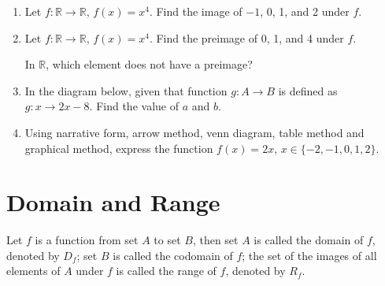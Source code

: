\documentclass{report}
\begin{document}
\begin{multicols}{2}
\begin{enumerate}
    \item Let $f: \mathbb{R} \to \mathbb{R}$, $f(x) = x^4$. Find the image of $-1$, 0, 1,
          and 2 under $f$.

    \item Let $f: \mathbb{R} \to \mathbb{R}$, $f(x) = x^4$. Find the preimage of 0, 1,
          and 4 under $f$.

          In $\mathbb{R}$, which element does not have a preimage?

    \item In the diagram below, given that function $g: A \to B$ is defined as $g: x \to
            2x - 8$. Find the value of $a$ and $b$.
          \begin{center}
          \end{center}

    \item Using narrative form, arrow method, venn diagram, table method and graphical
          method, express the function $f(x) = 2x$, $x \in \{-2, -1, 0, 1, 2\}$.
  \end{enumerate}

  \section{Domain and Range}

  \begin{mdframed}[style=MyFrame]
    Let $f$ is a function from set $A$ to set $B$, then set $A$ is called the domain of $f$, denoted by $D_f$; set $B$ is called the codomain of $f$; the set of the images of all elements of $A$ under $f$ is called the range of $f$, denoted by $R_f$.
  \end{mdframed}


\end{multicols}
\end{document}
